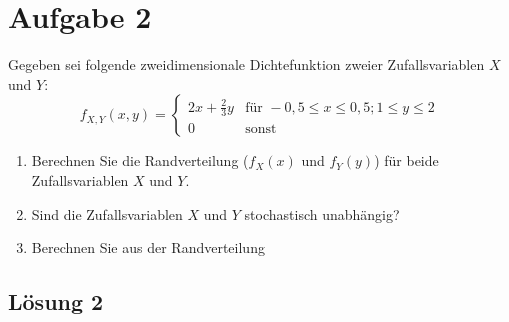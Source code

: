 \documentclass[main.tex]{subfiles}
\begin{document}
\section{Aufgabe 2}
Gegeben sei folgende zweidimensionale Dichtefunktion zweier Zufallsvariablen $X$ und $Y$:
$$ f_{X,Y}(x,y) 
= \begin{cases}
	2x + \frac{2}{3}y & \mbox{für } -0,5 \leq x \leq 0,5; 1 \leq y \leq 2 \\
	0				  & \mbox{sonst}
\end{cases} $$
\begin{enumerate}
\item Berechnen Sie die Randverteilung ($f_X(x)$ und $f_Y(y)$) für beide Zufallsvariablen $X$ und $Y$.
\item Sind die Zufallsvariablen $X$ und $Y$ stochastisch unabhängig?
\item Berechnen Sie aus der Randverteilung 
\end{enumerate}

\subsection{Lösung 2}
\end{document}
